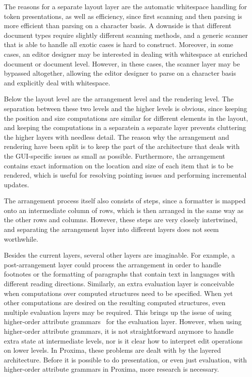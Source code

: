 \documentclass{speauth}
\begin{document}
The reasons for a separate layout layer are the automatic whitespace handling for token presentations, as well as efficiency, since first scanning and then parsing is more efficient than parsing on a character basis. A downside is that different document types require slightly different scanning methods, and a generic scanner that is able to handle all exotic cases is hard to construct. Moreover, in some cases, an editor designer may be interested in dealing with whitespace at enriched document or document level. However, in these cases, the scanner layer may be bypassed altogether, allowing the editor designer to parse on a character basis and explicitly deal with whitespace.

Below the layout level are the arrangement level and the rendering level. The separation between these two levels and the higher levels is obvious, since keeping the position and size computations \bc are similar for different elements in the layout, and keeping the computations in a separate\ec in a separate layer prevents cluttering the higher layers with needless detail. The reason why the arrangement and rendering have been split is to keep the part of the architecture that deals with the GUI-specific issues as small as possible. Furthermore, the arrangement contains exact information on the location and size of each item that is to be rendered, which is useful for resolving pointing issues and performing incremental updates. 

The arrangement process itself also consists of steps, since a formatter  is mapped onto an intermediate column of rows, which is then arranged in the same way as the other rows and columns. However, these steps are very closely intertwined, and separating the arrangement layer into different layers does not seem worthwhile. 

Besides the current layers, several other layers are imaginable. For example, a post-arrangement layer could process the arrangement in order to handle footnotes or the formatting of paragraphs that contain text in languages with different reading directions. Similarly, an extra evaluation layer is conceivable when computations over computed structures need to be specified. When yet other computations are desired on the resulting computed structures, even multiple evaluation layers may be required. This brings up the issue of using higher-order attribute grammars~\cite{vogt89Hags} for the evaluation layer.  However, when using higher-order attribute grammars, it is not straightforward anymore to handle extra state at intermediate levels, nor is it clear how to interpret edit operations on lower levels. In Proxima, these problems are dealt with by the layered architecture. Before it is possible to do presentation, or even just evaluation, with higher-order attribute grammars in Proxima, more research is necessary.
\end{document}
